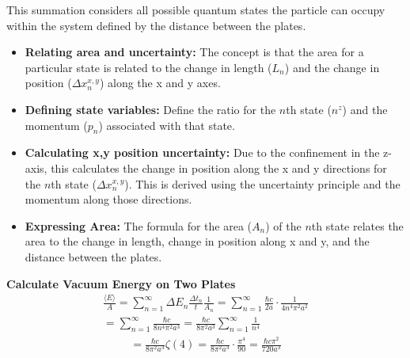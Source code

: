 This summation considers all possible quantum states the particle can occupy within the system 
defined by the distance between the plates.
\begin{itemize}
    \item \textbf{Relating area and uncertainty:} The concept is that the area for a particular state is related to 
    the change in length ($L_n$) and the change in position ($\Delta x_n^{x,y}$) along the x and y axes.
    \item \textbf{Defining state variables:} Define the ratio for the $n$th state ($n^z$) 
    and the momentum ($p_n$) associated with that state.
    \item \textbf{Calculating x,y position uncertainty:} Due to the confinement in the z-axis, 
    this calculates the change in position along the x and y directions for the $n$th state ($\Delta x_n^{x,y}$). 
    This is derived using the uncertainty principle and the momentum along those directions.
    \item \textbf{Expressing Area:} The formula for the area ($A_n$) of the $n$th state relates the area to the change in length, 
    change in position along x and y, and the distance between the plates.
    \end{itemize}
\noindent\textbf{Calculate Vacuum Energy on Two Plates}
\begin{align*}
    &\frac{\langle E \rangle}{A} = \sum_{n=1}^{\infty}\Delta E_n\frac{\Delta t_n}{t}\frac{1}{A_n} = \sum_{n=1}^{\infty} \frac{\hbar c }{2 a} \cdot \frac{1}{4 n^4 \pi^2 a^2} &\\
    &= \sum_{n=1}^{\infty} \frac{\hbar c}{8 n^4 \pi^2 a^3} = \frac{\hbar c}{8 \pi^2 a^3} \sum_{n=1}^{\infty} \frac{1}{n^4}&
\end{align*}
\begin{align}
    &= \frac{\hbar c}{8 \pi^2 a^3} \zeta(4) = \frac{\hbar c}{8 \pi^2 a^3} \cdot \frac{\pi^4}{90} = \frac{\hbar c \pi^2}{720 a^3}&
\end{align}